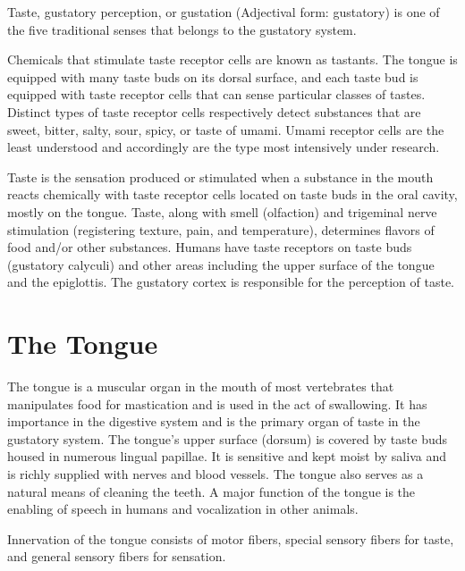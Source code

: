 Taste, gustatory perception, or gustation (Adjectival form: gustatory) is one of the five traditional senses that belongs to the gustatory system.

Chemicals that stimulate taste receptor cells are known as tastants. The tongue is equipped with many taste buds on its dorsal surface, and each taste bud is equipped with taste receptor cells that can sense particular classes of tastes. Distinct types of taste receptor cells respectively detect substances that are sweet, bitter, salty, sour, spicy, or taste of umami. Umami receptor cells are the least understood and accordingly are the type most intensively under research.

Taste is the sensation produced or stimulated when a substance in the mouth reacts chemically with taste receptor cells located on taste buds in the oral cavity, mostly on the tongue. Taste, along with smell (olfaction) and trigeminal nerve stimulation (registering texture, pain, and temperature), determines flavors of food and/or other substances. Humans have taste receptors on taste buds (gustatory calyculi) and other areas including the upper surface of the tongue and the epiglottis. The gustatory cortex is responsible for the perception of taste.

\hypertarget{the-tongue}{%
\section{The Tongue}\label{the-tongue}}

The tongue is a muscular organ in the mouth of most vertebrates that manipulates food for mastication and is used in the act of swallowing. It has importance in the digestive system and is the primary organ of taste in the gustatory system. The tongue's upper surface (dorsum) is covered by taste buds housed in numerous lingual papillae. It is sensitive and kept moist by saliva and is richly supplied with nerves and blood vessels. The tongue also serves as a natural means of cleaning the teeth. A major function of the tongue is the enabling of speech in humans and vocalization in other animals.

Innervation of the tongue consists of motor fibers, special sensory fibers for taste, and general sensory fibers for sensation.

